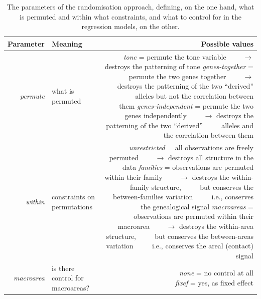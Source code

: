 \documentclass[twoside,twocolumn]{article}
\begin{document}
\begin{table}[h]
  \caption{The parameters of the randomisation approach, defining, on the one hand, what is permuted and within what constraints, and what to control for in the regression models, on the other.}
  \label{Tab:randomization_params}
  \centering
  \begin{tabularx}{\textwidth}{|r|X|r|}
    \toprule
    \textbf{Parameter} & \textbf{Meaning} & \textbf{Possible values} \\
    \midrule
    \textit{permute} & what is permuted & \makecell[l]{\textit{tone} = permute the tone variable\\~~~~$\rightarrow$ destroys the patterning of tone\\
      \textit{genes-together} = permute the two genes together\\~~~~$\rightarrow$ destroys the patterning of the two ``derived''\\~~~~ alleles but not the correlation between them\\
      \textit{genes-independent} = permute the two genes independently\\~~~~$\rightarrow$ destroys the patterning of the two ``derived''\\~~~~ alleles and the correlation between them} \\
    \midrule
    \textit{within} & constraints on permutations & \makecell[l]{\textit{unrestricted} = all observations are freely permuted\\~~~~$\rightarrow$ destroys all structure in the data\\
      \textit{families} = observations are permuted within their family\\~~~~$\rightarrow$ destroys the within-family structure,\\~~~~ but conserves the between-families variation\\~~~~ i.e., conserves the genealogical signal\\
      \textit{macroareas} = observations are permuted within their macroarea\\~~~~$\rightarrow$ destroys the within-area structure,\\~~~~ but conserves the between-areas variation\\~~~~ i.e., conserves the areal (contact) signal} \\
    \midrule
    \textit{macroarea} & is there control for macroareas? & \makecell[l]{\textit{none} = no control at all\\
      \textit{fixef} = yes, as fixed effect} \\
    \bottomrule
  \end{tabularx}
\end{table}
\end{document}
